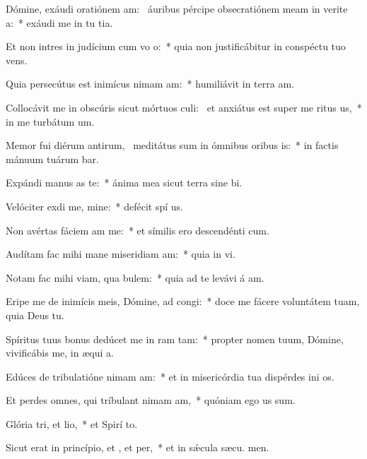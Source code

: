 \item Dómine, exáudi oratiónem am:~\pscross{} áuribus pércipe obsecratiónem meam in verite a:~* exáudi me in tu tia.
\item Et non intres in judícium cum vo o:~* quia non justificábitur in conspéctu tuo  vens.
\item Quia persecútus est inimícus nimam am:~* humiliávit in terra  am.
\item Collocávit me in obscúris sicut mórtuos culi:~\pscross{} et anxiátus est super me ritus us,~* in me turbátum   um.
\item Memor fui diérum antirum,~\pscross{} meditátus sum in ómnibus oribus is:~* in factis mánuum tuárum bar.
\item Expándi manus as  te:~* ánima mea sicut terra sine  bi.
\item Velóciter exdi me, mine:~* defécit spí us.
\item Non avértas fáciem am  me:~* et símilis ero descendénti  cum.
\item Audítam fac mihi mane miseridiam am:~* quia in  vi.
\item Notam fac mihi viam,  qua bulem:~* quia ad te levávi á am.
\item Eripe me de inimícis meis, Dómine, ad  congi:~* doce me fácere voluntátem tuam, quia Deus   tu.
\item Spíritus tuus bonus dedúcet me in ram tam:~* propter nomen tuum, Dómine, vivificábis me, in æqui a.
\item Edúces de tribulatióne nimam am:~* et in misericórdia tua dispérdes ini os.
\item Et perdes omnes, qui tríbulant nimam am,~* quóniam ego  us sum.
\item Glória tri, et lio,~* et Spirí to.
\item Sicut erat in princípio, et , et per,~* et in sǽcula sæcu. men.
